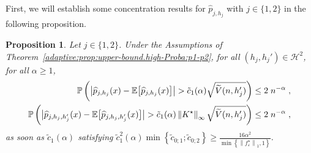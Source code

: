 \documentclass[11pt,a4paper,openany]{article}
\newtheorem{proposition}[thm]{Proposition}
\def\E{\mathbb{E}}
\begin{document}
First, we will establish some concentration results for  $\widehat{p}_{j,h_{j}}$ with  $j\in\{1,2\}$ in the following proposition.  
\begin{proposition}
	\label{proposition:apply.Bernstein.inequa:study.adaptation}
	Let $j\in\{1,2\}$.	Under the Assumptions of Theorem~\ref{adaptive:prop:upper-bound.high-Proba:p1-p2}, for all $(h_{j}, h_{j}') \in \mathcal{H}^2_{}$, for all $\alpha  \geq  1$,    
	\begin{align*}
		\mathbb{P} \left( \big| \widehat{p}_{j, h_{j}}(x) - \E \big[ \widehat{p}_{j, h_{j} }(x) \big]  \big|  >  \tilde c_{1}(\alpha)    \sqrt{\widetilde{V}(n,h_{j}')} \right)  &\leq  2 \hspace{0.1cm}  n^{- \alpha} \hspace{0.1cm}  ,
		\\
		\mathbb{P} \left( \big| \widehat{p}_{j, h_{j} ,h_{j}'}(x) - \E \big[ \widehat{p}_{j, h_{j} ,h_{j}'}(x) \big] \big|  >  \tilde c_{1}(\alpha)    \left\| K^{\star}   \right\|_{\infty}   \sqrt{\widetilde{V}(n,h_{j}')} \right)  &\leq  2 \hspace{0.1cm}  n^{- \alpha} \hspace{0.1cm}  ,
	\end{align*}
	as soon as $\tilde c_{1}(\alpha)$ satisfying $\tilde c^2_{1}(\alpha) \min \left\{\tilde  c_{0;1} ; \tilde  c_{0;2} \right\}   \geq  \frac{16 \alpha^{2}}{  \min  \left\{     \left\| f_{\varepsilon}^{\star} \right\|_{1},      1  \right\} }$.
\end{proposition}
\end{document}
